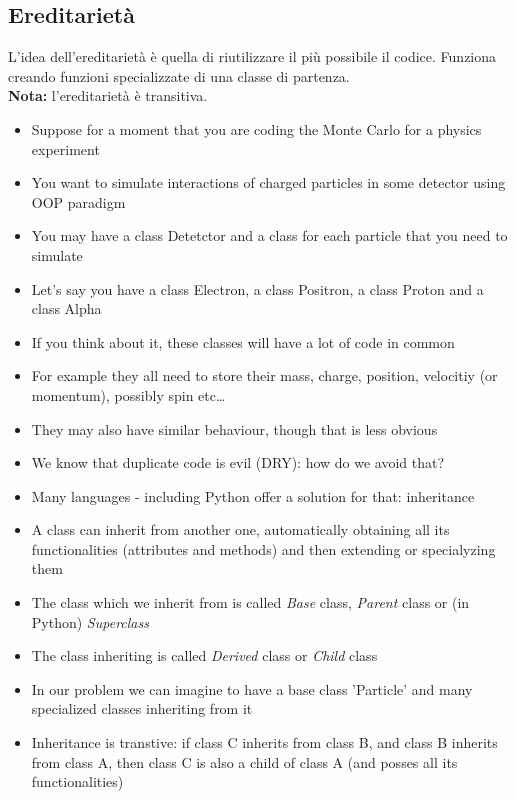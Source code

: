 \newpage

\subsection{Ereditarietà}
L'idea dell'ereditarietà è quella di riutilizzare il più possibile il codice. Funziona creando funzioni specializzate di una classe di partenza.\\
\textbf{Nota:} l'ereditarietà è transitiva.\\

  \begin{itemize}
    \small
    \item Suppose for a moment that you are coding the Monte Carlo for a physics experiment
    \item You want to simulate interactions of charged particles in some detector using OOP paradigm
    \item You may have a class Detetctor and a class for each particle that you need to simulate
    \item Let's say you have a class Electron, a class Positron, a class Proton and a class Alpha
    \item If you think about it, these classes will have a lot of code in common
    \item For example they all need to store their mass, charge, position, velocitiy (or momentum), possibly spin etc\dots
    \item They may also have similar behaviour, though that is less obvious
    \item We know that duplicate code is evil (DRY): how do we avoid that?
  \end{itemize}

  \begin{itemize}
    \small
    \item Many languages - including Python offer a solution for that: \alert{inheritance}
    \item A class can inherit from another one, automatically obtaining all its functionalities (attributes and methods) and then extending or specialyzing them
    \item The class which we inherit from is called \emph{Base} class, \emph{Parent} class or (in Python) \emph{Superclass}
    \item The class inheriting is called \emph{Derived} class or \emph{Child} class
    \item In our problem we can imagine to have a base class 'Particle' and many specialized classes inheriting from it
    \item Inheritance is transtive: if class C inherits from class B, and class B inherits from class A, then class C is also a child of class A (and posses all its functionalities)
  \end{itemize}


